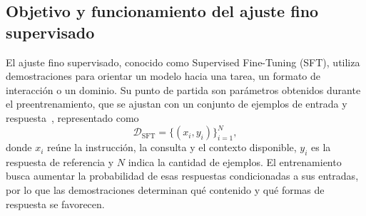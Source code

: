\subsection{Objetivo y funcionamiento del ajuste fino supervisado}
\label{sec:sft-objetivo}
El ajuste fino supervisado, conocido como Supervised Fine-Tuning (SFT), utiliza demostraciones para orientar un modelo hacia una tarea, un formato de interacción o un dominio. Su punto de partida son parámetros obtenidos durante el preentrenamiento, que se ajustan con un conjunto de ejemplos de entrada y respuesta~\cite{ouyang2022instructgpt}, representado como
\begin{equation}
\mathcal{D}_{\mathrm{SFT}}=\{(x_i,y_i)\}_{i=1}^{N},
\label{eq:datos-sft}
\end{equation}
donde $x_i$ reúne la instrucción, la consulta y el contexto disponible, $y_i$ es la respuesta de referencia y $N$ indica la cantidad de ejemplos. El entrenamiento busca aumentar la probabilidad de esas respuestas condicionadas a sus entradas, por lo que las demostraciones determinan qué contenido y qué formas de respuesta se favorecen.


